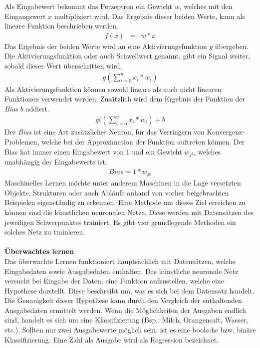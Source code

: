 \documentclass[a4paper,12pt,oneside]{article}
\begin{document}
Als Eingabewert bekommt das Perzeptron ein Gewicht $w$, welches mit den Eingangswert $x$ multipliziert wird. Das Ergebnis dieser beiden Werte, kann als lineare Funktion beschrieben werden.
\begin{eqnarray} f(x) & = & w*x \end{eqnarray}
Das Ergebnis der beiden Werte wird an eine Aktivierungsfunktion $g$ übergeben. Die Aktivierungsfunktion oder auch Schwellwert genannt, gibt ein Signal weiter, sobald dieser Wert überschritten wird.
\begin{eqnarray} g( \sum_{i=0}^n x_{i} *w_{i}) \end{eqnarray}
Als Aktivierungsfunktion können sowohl lineare als auch nicht linearen Funktionen verwendet werden. Zusätzlich wird dem Ergebnis der Funktion der \textit{Bias} $b$ addiert.
\begin{eqnarray} g(( \sum_{i=0}^n x_{i} *w_{i}) +b \end{eqnarray}
Der \textit{Bias} ist eine Art zusätzliches Neuron, für das Verringern von Konvergenz-Problemen, welche bei der Approximation der Funktion auftreten können. Der Bias hat immer einen Eingabewert von 1 und ein Gewicht $w_{jb}$, welches unabhängig der Eingabewerte ist.
\begin{eqnarray} Bias = 1*w_{jb} \end{eqnarray}
Maschinelles Lernen möchte unter anderem Maschinen in die Lage versetzten Objekte, Strukturen oder auch Abläufe anhand von vorher beigebrachten Beispielen eigenständig zu erkennen. Eine Methode um dieses Ziel erreichen zu können sind die künstlichen neuronalen Netze. Diese werden mit Datensätzen des jeweiligen Schwerpunktes trainiert. Es gibt vier grundlegende Methoden ein solches Netz zu trainieren.\\\\
\textbf{Überwachtes lernen}\\
Das überwachte Lernen funktioniert hauptsächlich mit Datensätzen, welche Eingabedaten sowie Ausgabedaten enthalten. Das künstliche neuronale Netz versucht bei Eingabe der Daten, eine Funktion aufzustellen, welche eine Hypothese darstellt. Diese beschreibt um, was es sich bei dem Datensatz handelt. Die Genauigkeit dieser Hypothese kann durch den Vergleich der enthaltenden Ausgabedaten ermittelt werden. Wenn die Möglichkeiten der Ausgaben endlich sind, handelt es sich um eine Klassifizierung (Bsp.: Milch, Orangensaft, Wasser, etc.). Sollten nur zwei Ausgabewerte möglich sein, ist es eine boolsche bzw. binäre Klassifizierung. Eine Zahl als Ausgabe wird als Regression bezeichnet.\\\\
\end{document}
